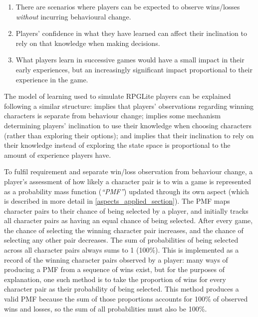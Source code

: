\begin{enumerate}
  \item There are scenarios where players can be expected to observe wins/losses
  \emph{without} incurring behavioural change.
  \item Players' confidence in what they have learned can affect their
  inclination to rely on that knowledge when making decisions.
  \item What players learn in successive games would have a small impact in
  their early experiences, but an increasingly significant impact proportional
  to their experience in the game.
\end{enumerate}

The model of learning used to simulate RPGLite players can be explained
following a similar structure:  implies that players' observations
regarding winning characters is separate from behaviour change;  implies
some mechanism determining players' inclination to use their knowledge when choosing
characters (rather than exploring their options); and  implies that
their inclination to rely on their knowledge instead of exploring the state
space is proportional to the amount of experience players have.

To fulfil requirement  and separate win/loss observation from
behaviour change, a player's assessment of how likely a character pair is to win
a game is represented as a probability mass function (\emph{``PMF''}) updated
through its own aspect (which is described in more detail in
\cref{aspects_applied_section}). The PMF maps character pairs to their chance of
being selected by a player, and initially tracks all character pairs as having
an equal chance of being selected. After every game, the chance of selecting the
winning character pair increases, and the chance of selecting any other pair
decreases. The sum of probabilities of being selected across all character pairs
always sums to 1 (100\%). This is implemented as a record of the winning
character pairs observed by a player: many ways of producing a PMF from a
sequence of wins exist, but for the purposes of explanation, one such method is
to take the proportion of wins for every character pair as their probability of
being selected. This method produces a valid PMF because the sum of those
proportions accounts for 100\% of observed wins and losses, so the sum of all
probabilities must also be 100\%.

